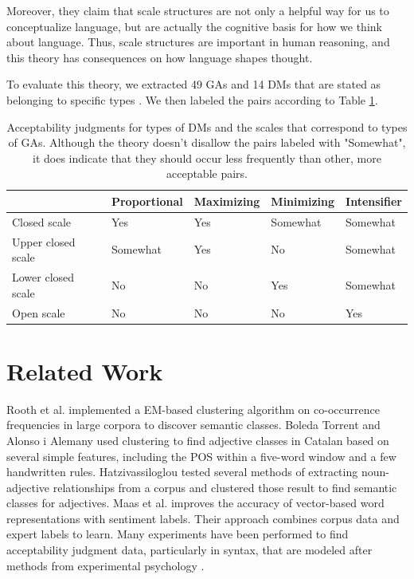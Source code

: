 \documentclass[11pt]{article}
\begin{document}
Moreover, they claim that scale structures are not only a helpful way for us to conceptualize language, but are actually the cognitive basis for how we think about language. Thus, scale structures are important in human reasoning, and this theory has consequences on how language shapes thought.

To evaluate this theory, we extracted 49 GAs and 14 DMs that are stated as belonging to specific types \cite{kennedymcnally} \cite{kennedy07}. We then labeled the pairs according to Table \ref{tab:theory-table}.

\begin{center}
\begin{table}[ht]
\hfill{}
\begin{tabular}{|l|l|l|l|l|}
\hline & \bf Proportional & \bf Maximizing & \bf Minimizing & \bf Intensifier \\ \hline
Closed scale & Yes & Yes & Somewhat & Somewhat \\ \hline
Upper closed scale & Somewhat & Yes & No & Somewhat \\ \hline
Lower closed scale & No & No & Yes & Somewhat \\ \hline
Open scale & No & No & No & Yes \\ \hline
\end{tabular}
\hfill{}
\caption{\label{tab:theory-table} Acceptability judgments for types of DMs and the scales that correspond to types of GAs. Although the theory doesn't disallow the pairs labeled with "Somewhat", it does indicate that they should occur less frequently than other, more acceptable pairs.}
\end{table}
\end{center}

\section{Related Work}

Rooth et al.  implemented a EM-based clustering algorithm on co-occurrence frequencies in large corpora to discover semantic classes. Boleda Torrent and Alonso i Alemany  used clustering to find adjective classes in Catalan based on several simple features, including the POS within a five-word window and a few handwritten rules. Hatzivassiloglou  tested several methods of extracting noun-adjective relationships from a corpus and clustered those result to find semantic classes for adjectives. Maas et al.  improves the accuracy of vector-based word representations with sentiment labels. Their approach combines corpus data and expert labels to learn. Many experiments have been performed to find acceptability judgment data, particularly in syntax, that are modeled after methods from experimental psychology \cite{sprouse}.
\end{document}
